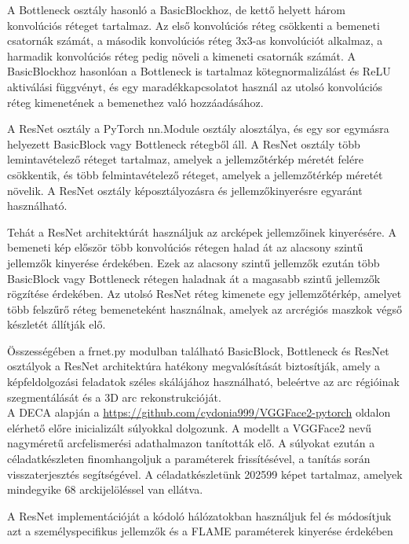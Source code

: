 \documentclass[12pt,a4]{article}
\begin{document}
            A Bottleneck osztály hasonló a BasicBlockhoz, de kettő helyett három konvolúciós réteget tartalmaz.
            Az első konvolúciós réteg csökkenti a bemeneti csatornák számát, a második konvolúciós réteg 3x3-as konvolúciót alkalmaz, a harmadik konvolúciós réteg pedig növeli a kimeneti csatornák számát.
            A BasicBlockhoz hasonlóan a Bottleneck is tartalmaz kötegnormalizálást és ReLU aktiválási függvényt, és egy maradékkapcsolatot használ az utolsó konvolúciós réteg kimenetének a bemenethez való hozzáadásához.
            
            A ResNet osztály a PyTorch nn.Module osztály alosztálya, és egy sor egymásra helyezett BasicBlock vagy Bottleneck rétegből áll.
            A ResNet osztály több lemintavételező réteget tartalmaz, amelyek a jellemzőtérkép méretét felére csökkentik, és több felmintavételező réteget, amelyek a jellemzőtérkép méretét növelik.
            A ResNet osztály képosztályozásra és jellemzőkinyerésre egyaránt használható.
             
            Tehát a ResNet architektúrát használjuk az arcképek jellemzőinek kinyerésére. A bemeneti kép először több konvolúciós rétegen halad át az alacsony szintű jellemzők kinyerése érdekében.
            Ezek az alacsony szintű jellemzők ezután több BasicBlock vagy Bottleneck rétegen haladnak át a magasabb szintű jellemzők rögzítése érdekében. 
            Az utolsó ResNet réteg kimenete egy jellemzőtérkép, amelyet több felszűrő réteg bemeneteként használnak, amelyek az arcrégiós maszkok végső készletét állítják elő.
            
            Összességében a frnet.py modulban található BasicBlock, Bottleneck és ResNet osztályok a ResNet architektúra hatékony megvalósítását biztosítják, 
            amely a képfeldolgozási feladatok széles skálájához használható, beleértve az arc régióinak szegmentálását és a 3D arc rekonstrukcióját. \\

            A DECA alapján a \url{https://github.com/cydonia999/VGGFace2-pytorch} oldalon elérhető előre inicializált súlyokkal dolgozunk. A modellt a VGGFace2 nevű nagyméretű arcfelismerési adathalmazon tanították elő.
            A súlyokat ezután a céladatkészleten finomhangoljuk a paraméterek frissítésével, a tanítás során visszaterjesztés segítségével.
            A céladatkészletünk 202599 képet tartalmaz, amelyek mindegyike 68 arckijelöléssel van ellátva.

            A ResNet implementációját a kódoló hálózatokban használjuk fel és módosítjuk azt a személyspecifikus jellemzők és a FLAME paraméterek kinyerése érdekében
                     
\end{document}
